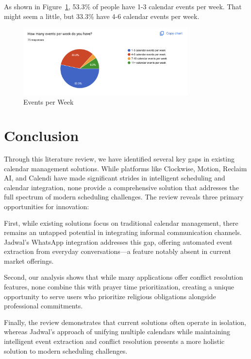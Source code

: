 \documentclass[12pt,a4paper,twoside]{report}
\begin{document}
As shown in Figure~\ref{fig:events-per-week}, 53.3\% of people have 1-3 calendar events per week. That might seem a little, but 33.3\% have 4-6 calendar events per week.

\begin{figure}[!h]
    \centering
    \includegraphics[width=0.8\textwidth]{images/survey/events-per-week.png}
    \caption{Events per Week}
    \label{fig:events-per-week}
\end{figure}

\section{Conclusion}

Through this literature review, we have identified several key gaps in existing calendar management solutions. While platforms like Clockwise, Motion, Reclaim AI, and Calendi have made significant strides in intelligent scheduling and calendar integration, none provide a comprehensive solution that addresses the full spectrum of modern scheduling challenges. The review reveals three primary opportunities for innovation:

First, while existing solutions focus on traditional calendar management, there remains an untapped potential in integrating informal communication channels. Jadwal's WhatsApp integration addresses this gap, offering automated event extraction from everyday conversations—a feature notably absent in current market offerings.

Second, our analysis shows that while many applications offer conflict resolution features, none combine this with prayer time prioritization, creating a unique opportunity to serve users who prioritize religious obligations alongside professional commitments.

Finally, the review demonstrates that current solutions often operate in isolation, whereas Jadwal's approach of unifying multiple calendars while maintaining intelligent event extraction and conflict resolution presents a more holistic solution to modern scheduling challenges.
\end{document}
